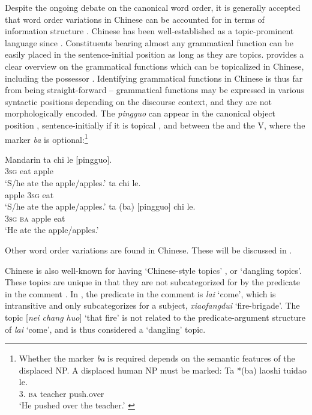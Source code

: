 \documentclass[output=paper,chinesefont,hidelinks]{langscibook}
\begin{document}
Despite the ongoing debate on the canonical word order, it is generally accepted that word order variations in Chinese can be accounted for in terms of information structure \citep{Shyu2016}. Chinese has been well-established as a topic-prominent language since \citet{LiThompson1976}. Constituents bearing almost any grammatical function can be easily placed in the sentence-initial position as long as they are topics. \citet{Kroeger04} provides a clear overview on the grammatical functions which can be topicalized in Chinese, including the possessor \citep{XuLangendoen1985}. Identifying grammatical functions in Chinese is thus far from being straight-forward – grammatical functions may be expressed in various syntactic positions depending on the discourse context, and they are not morphologically encoded. The {\OBJ} \textit{pingguo} can appear in the canonical object position , sentence-initially if it is topical , and between the \SUBJ and the V, where the marker \textit{ba} is optional:\footnote{Whether the marker \textit{ba} is required depends on the semantic features of the displaced NP. A displaced human NP must be marked:
\ea \gll Ta   *(ba)   laoshi    tuidao    le.\\
3{\SG.\M}    {\db\db}\textsc{ba}  teacher    push.over  \PFV\\
\glt `He pushed over the teacher.' \citep[1622]{YangBergen2007}
\z
}

\ea%
    \label{ex:Sinitic:8}Mandarin
\ea\label{ex:Sinitic:8a}
    \gll ta  chi  le  [pingguo].\\
         \textsc{3sg}   eat  {\PFV}  {\db}apple\\
    \glt`S/he ate the apple/apples.'
\ex\label{ex:Sinitic:8b}
    \gll [pingguo]   ta  chi  le.\\
         {\db}apple   \textsc{3sg}   eat  \PFV\\
         \glt `S/he ate the apple/apples.'
\ex\label{ex:Sinitic:8c}
\gll ta   (ba)  [pingguo]   chi   le.\\
\textsc{3sg}   {\db}\textsc{ba}  {\db}apple    eat  \PFV\\
\glt`He ate the apple/apples.' \citep[1622]{YangBergen2007}
\z\z

Other word order variations are found in Chinese. These will be discussed in .  

  Chinese is also well-known for having `Chinese-style topics' \citep{Chafe1976}, or `dangling topics'. These topics are unique in that they are not subcategorized for by the predicate in the comment \citep{PanHu2008}. In , the predicate in the comment is \textit{lai} `come', which is intransitive and only subcategorizes for a subject, \textit{xiaofangdui} `fire-brigade'. The topic [\textit{nei chang huo}] `that fire' is not related to the predicate-argument structure of \textit{lai} `come', and is thus considered  a `dangling' topic.
\end{document}

